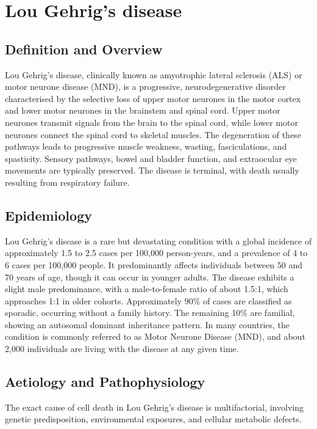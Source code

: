 \chapter{Lou Gehrig's disease}

\section*{Definition and Overview}
Lou Gehrig's disease, clinically known as amyotrophic lateral sclerosis (ALS) or motor neurone disease (MND), is a progressive, neurodegenerative disorder characterised by the selective loss of upper motor neurones in the motor cortex and lower motor neurones in the brainstem and spinal cord. Upper motor neurones transmit signals from the brain to the spinal cord, while lower motor neurones connect the spinal cord to skeletal muscles. The degeneration of these pathways leads to progressive muscle weakness, wasting, fasciculations, and spasticity. Sensory pathways, bowel and bladder function, and extraocular eye movements are typically preserved. The disease is terminal, with death usually resulting from respiratory failure.

\section*{Epidemiology}
Lou Gehrig's disease is a rare but devastating condition with a global incidence of approximately 1.5 to 2.5 cases per 100,000 person-years, and a prevalence of 4 to 6 cases per 100,000 people. It predominantly affects individuals between 50 and 70 years of age, though it can occur in younger adults. The disease exhibits a slight male predominance, with a male-to-female ratio of about 1.5:1, which approaches 1:1 in older cohorts. Approximately 90\% of cases are classified as sporadic, occurring without a family history. The remaining 10\% are familial, showing an autosomal dominant inheritance pattern. In many countries, the condition is commonly referred to as Motor Neurone Disease (MND), and about 2,000 individuals are living with the disease at any given time.

\section*{Aetiology and Pathophysiology}
The exact cause of cell death in Lou Gehrig's disease is multifactorial, involving genetic predisposition, environmental exposures, and cellular metabolic defects.

